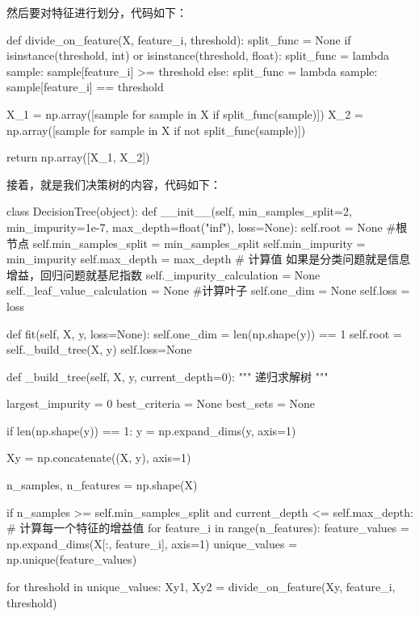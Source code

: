 \documentclass[UTF8,a4paper,10pt]{ctexart}
\begin{document}
然后要对特征进行划分，代码如下：

\begin{python}
    def divide_on_feature(X, feature_i, threshold):
    split_func = None
    if isinstance(threshold, int) or isinstance(threshold, float):
        split_func = lambda sample: sample[feature_i] >= threshold
    else:
        split_func = lambda sample: sample[feature_i] == threshold

    X_1 = np.array([sample for sample in X if split_func(sample)])
    X_2 = np.array([sample for sample in X if not split_func(sample)])

    return np.array([X_1, X_2])
\end{python}

接着，就是我们决策树的内容，代码如下：

\begin{python}
    class DecisionTree(object):
    def __init__(self, min_samples_split=2, min_impurity=1e-7,
                 max_depth=float("inf"), loss=None):
        self.root = None  #根节点
        self.min_samples_split = min_samples_split
        self.min_impurity = min_impurity
        self.max_depth = max_depth
        # 计算值 如果是分类问题就是信息增益，回归问题就基尼指数
        self._impurity_calculation = None
        self._leaf_value_calculation = None #计算叶子
        self.one_dim = None
        self.loss = loss

    def fit(self, X, y, loss=None):
        self.one_dim = len(np.shape(y)) == 1
        self.root = self._build_tree(X, y)
        self.loss=None

    def _build_tree(self, X, y, current_depth=0):
        """
        递归求解树
        """

        largest_impurity = 0
        best_criteria = None
        best_sets = None

        if len(np.shape(y)) == 1:
            y = np.expand_dims(y, axis=1)

        Xy = np.concatenate((X, y), axis=1)

        n_samples, n_features = np.shape(X)

        if n_samples >= self.min_samples_split and current_depth <= self.max_depth:
            # 计算每一个特征的增益值
            for feature_i in range(n_features):
                feature_values = np.expand_dims(X[:, feature_i], axis=1)
                unique_values = np.unique(feature_values)

                for threshold in unique_values:
                    Xy1, Xy2 = divide_on_feature(Xy, feature_i, threshold)


\end{python}
\end{document}
